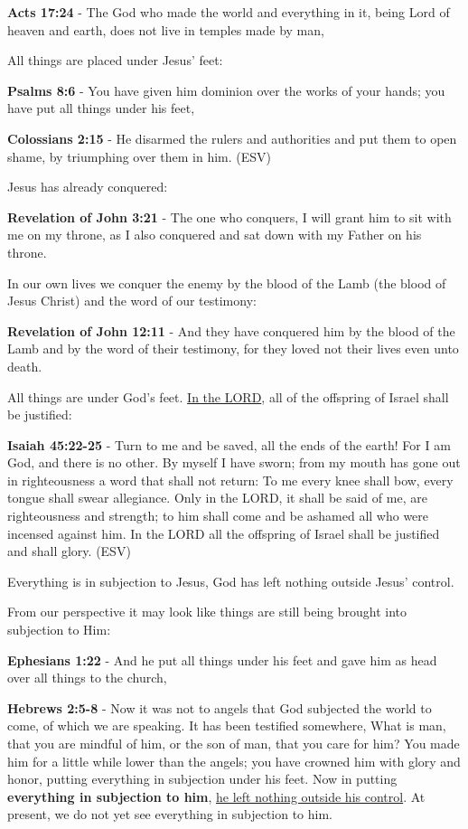 \documentclass[11pt]{article}
\begin{document}
\textbf{Acts 17:24} - The God who made the world and everything in it, being Lord of heaven and earth, does not live in temples made by man,

All things are placed under Jesus' feet:

\textbf{Psalms 8:6} - You have given him dominion over the works of your hands; you have put all things under his feet,

\textbf{Colossians 2:15} - He disarmed the rulers and authorities and put them to open shame, by triumphing over them in him.  (ESV)

Jesus has already conquered:

\textbf{Revelation of John 3:21} - The one who conquers, I will grant him to sit with me on my throne, as I also conquered and sat down with my Father on his throne.

In our own lives we conquer the enemy by the blood of the Lamb (the blood of Jesus Christ) and the word of our testimony:

\textbf{Revelation of John 12:11} - And they have conquered him by the blood of the Lamb and by the word of their testimony, for they loved not their lives even unto death.

All things are under God's feet. \uline{In the LORD}, all of the offspring of Israel shall be justified:

\textbf{Isaiah 45:22-25} - Turn to me and be saved, all the ends of the earth! For I am God, and there is no other. By myself I have sworn; from my mouth has gone out in righteousness a word that shall not return: To me every knee shall bow, every tongue shall swear allegiance. Only in the LORD, it shall be said of me, are righteousness and strength; to him shall come and be ashamed all who were incensed against him. In the LORD all the offspring of Israel shall be justified and shall glory. (ESV)

Everything is in subjection to Jesus, God has left nothing outside Jesus' control.

From our perspective it may look like things are still being brought into subjection to Him:

\textbf{Ephesians 1:22} - And he put all things under his feet and gave him as head over all things to the church,

\textbf{Hebrews 2:5-8} - Now it was not to angels that God subjected the world to come, of which we are speaking. It has been testified somewhere, What is man, that you are mindful of him, or the son of man, that you care for him? You made him for a little while lower than the angels; you have crowned him with glory and honor, putting everything in subjection under his feet. Now in putting \textbf{everything in subjection to him}, \uline{he left nothing outside his control}. At present, we do not yet see everything in subjection to him.
\end{document}
